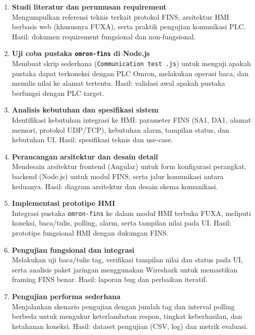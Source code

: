 \begin{enumerate}
    \item \textbf{Studi literatur dan perumusan requirement}\\
    Mengumpulkan referensi teknis terkait protokol FINS, arsitektur HMI berbasis web (khususnya FUXA), serta praktik pengujian komunikasi PLC. 
    Hasil: dokumen requirement fungsional dan non-fungsional.
    
    \item \textbf{Uji coba pustaka \texttt{omron-fins} di Node.js}\\
    Membuat skrip sederhana (\texttt{Communication test .js}) untuk menguji apakah pustaka dapat terkoneksi dengan PLC Omron, melakukan operasi baca, dan menulis nilai ke alamat tertentu. 
    Hasil: validasi awal apakah pustaka berfungsi dengan PLC target.

    \item \textbf{Analisis kebutuhan dan spesifikasi sistem}\\
    Identifikasi kebutuhan integrasi ke HMI: parameter FINS (SA1, DA1, alamat memori, protokol UDP/TCP), kebutuhan alarm, tampilan status, dan kebutuhan UI. 
    Hasil: spesifikasi teknis dan use-case.

    \item \textbf{Perancangan arsitektur dan desain detail}\\
    Mendesain arsitektur frontend (Angular) untuk form konfigurasi perangkat, backend (Node.js) untuk modul FINS, serta jalur komunikasi antara keduanya. 
    Hasil: diagram arsitektur dan desain skema komunikasi.

    \item \textbf{Implementasi prototipe HMI}\\
    Integrasi pustaka \texttt{omron-fins} ke dalam modul HMI terbuka FUXA, meliputi koneksi, baca/tulis, polling, alarm, serta tampilan nilai pada UI. 
    Hasil: prototipe fungsional HMI dengan dukungan FINS.

    \item \textbf{Pengujian fungsional dan integrasi}\\
    Melakukan uji baca/tulis tag, verifikasi tampilan nilai dan status pada UI, serta analisis paket jaringan menggunakan Wireshark untuk memastikan framing FINS benar. 
    Hasil: laporan bug dan perbaikan iteratif.

    \item \textbf{Pengujian performa sederhana}\\
    Menjalankan skenario pengujian dengan jumlah tag dan interval polling berbeda untuk mengukur keterlambatan respon, tingkat keberhasilan, dan ketahanan koneksi. 
    Hasil: dataset pengujian (CSV, log) dan metrik evaluasi.


\end{enumerate}
